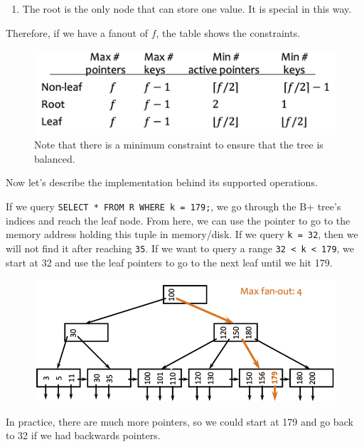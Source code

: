 \documentclass{article}
\begin{document}
\begin{definition}[B+ Tree]
\begin{enumerate}
          \item The root is the only node that can store one value. It is special in this way. 
        \end{enumerate}
      \end{definition}

      Therefore, if we have a fanout of $f$, the table shows the constraints. 

      \begin{figure}[H]
        \centering 
        \includegraphics[scale=0.3]{img/chart.png}
        \caption{Note that there is a minimum constraint to ensure that the tree is balanced. } 
        \label{fig:chart}
      \end{figure}

      Now let's describe the implementation behind its supported operations. 

      \begin{algo}[Lookup]
        If we query \texttt{SELECT * FROM R WHERE k = 179;}, we go through the B+ tree's indices and reach the leaf node. From here, we can use the pointer to go to the memory address holding this tuple in memory/disk. If we query \texttt{k = 32}, then we will not find it after reaching \texttt{35}. If we want to query a range \texttt{32 < k < 179}, we start at 32 and use the leaf pointers to go to the next leaf until we hit 179.  

        \begin{figure}[H]
          \centering 
          \includegraphics[scale=0.4]{img/fanout_ex.png}
          \caption{} 
          \label{fig:fanout_ex}
        \end{figure}

        In practice, there are much more pointers, so we could start at 179 and go back to 32 if we had backwards pointers. 
      \end{algo}
\end{document}
